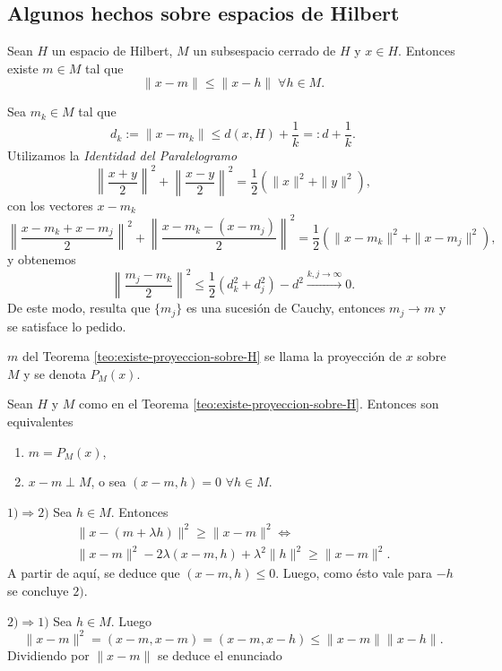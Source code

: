\subsection{Algunos hechos sobre espacios de Hilbert}

\begin{teorema}{}\label{teo:existe-proyeccion-sobre-H}
Sean $H$ un espacio de Hilbert,  $M$ un subsespacio cerrado de $H$ y  $x \in H$. Entonces existe $m \in M$ tal que 
\[
\|x-m\| \leq \|x-h\|\; \forall h \in M.
\]
\end{teorema}

\begin{demo}
Sea $m_k \in M$ tal que  
\[d_k:= \|x-m_k\| \leq  d(x,H)+\frac{1}{k}=:d+\frac{1}{k}. \]
Utilizamos la \emph{Identidad del Paralelogramo}
\[ 
\left\| \frac{x+y}{2} \right\|^2 +\left\| \frac{x-y}{2} \right\|^2
= \frac{1}{2}\left(\| x \|^2+ \|y\|^2  \right), 
\]
con los vectores $x-m_k$
\[ 
\left\| \frac{x-m_k+x-m_j}{2} \right\|^2 +\left\| \frac{x-m_k-(x-m_j)}{2} \right\|^2
= \frac{1}{2}\left(\| x-m_k \|^2+ \|x-m_j\|^2  \right), 
\]
y obtenemos
\[
\left\| \frac{m_j-m_k}{2} \right\|^2 \leq \frac{1}{2} \left(d_k^2 +d_j^2\right)-d^2
\xrightarrow[]{k,j \to \infty}0.
\]
De este modo, resulta que $\{m_j\}$ es una sucesi\'on de Cauchy, entonces $m_j \to m$ 
y se satisface lo pedido.
\end{demo}

\begin{definicion}{}
$m$ del Teorema \ref{teo:existe-proyeccion-sobre-H} se llama la proyecci\'on de $x$ sobre $M$ y se denota $P_M(x)$.
\end{definicion}

\begin{teorema}{}
Sean $H$ y $M$ como en el Teorema \ref{teo:existe-proyeccion-sobre-H}. 
Entonces son equivalentes
\begin{enumerate}
    \item $m=P_M(x)$,
    \item $x-m \perp M$, o sea  $(x-m,h )=0$ $\forall h \in M$.
\end{enumerate}
\end{teorema}

\begin{demo}
$1) \Rightarrow 2)$
Sea $h\in M$. Entonces
\[
\begin{split}
\|x-(m+\lambda h)  \|^2 \geq \| x-m\|^2 \Leftrightarrow
\\
\|x-m\|^2-2\lambda (x-m,h)+\lambda^2 \|h\|^2\geq \|x-m\|^2.
\end{split}
\]
A partir de aqu\'i, se deduce que $(x-m,h)\leq 0$. Luego, como \'esto vale para $-h$ se concluye $2)$.

$2) \Rightarrow 1)$ Sea $h\in M$. Luego
\[
\|x-m\|^2=(x-m,x-m)=(x-m,x-h)\leq \|x-m\| \|x-h\|.
\]
Dividiendo por $\|x-m\|$ se deduce el enunciado

\end{demo}

